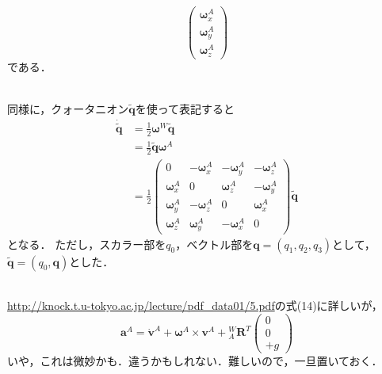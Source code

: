 \begin{description}
\begin{equation}
    \begin{pmatrix}
      \boldsymbol{\omega}^{A}_{x}\\
      \boldsymbol{\omega}^{A}_{y}\\
      \boldsymbol{\omega}^{A}_{z}
    \end{pmatrix}
  \end{equation}
  である．
\item[\fullref{subsec:quat}]\mbox{}\\
  同様に，クォータニオン$\tilde{\boldsymbol{q}}$を使って表記すると
  \begin{align}
    \dot{\tilde{\boldsymbol{q}}} & = \frac{1}{2}\boldsymbol{\omega}^{W}\tilde{\boldsymbol{q}}\\
    & = \frac{1}{2}\tilde{\boldsymbol{q}}\boldsymbol{\omega}^{A}\\
    & = \frac{1}{2}
    \begin{pmatrix}
      0                           & - \boldsymbol{\omega}^{A}_{x} & - \boldsymbol{\omega}^{A}_{y} & - \boldsymbol{\omega}^{A}_{z}\\
      \boldsymbol{\omega}^{A}_{x} & 0                             &   \boldsymbol{\omega}^{A}_{z} & - \boldsymbol{\omega}^{A}_{y}\\
      \boldsymbol{\omega}^{A}_{y} & - \boldsymbol{\omega}^{A}_{z} & 0                             &   \boldsymbol{\omega}^{A}_{x}\\
      \boldsymbol{\omega}^{A}_{z} &   \boldsymbol{\omega}^{A}_{y} & - \boldsymbol{\omega}^{A}_{x} & 0
    \end{pmatrix}
    \tilde{\boldsymbol{q}}
  \end{align}
  となる．
  ただし，スカラー部を$q_0$，ベクトル部を$\boldsymbol{q} = (q_1, q_2, q_3)$として，
  $\tilde{\boldsymbol{q}} = (q_0, \boldsymbol{q})$とした．
\item[\fullref{subsec:acc}]\mbox{}\\
  \url{http://knock.t.u-tokyo.ac.jp/lecture/pdf_data01/5.pdf}の式(14)に詳しいが，
  \begin{equation}
    \boldsymbol{a}^{A} = \dot{\boldsymbol{v}}^{A} + \boldsymbol{\omega}^{A} \times \boldsymbol{v}^{A} + {}^{W}_{A}\boldsymbol{R}^{T}
    \begin{pmatrix}
      0\\
      0\\
      +g
    \end{pmatrix}
  \end{equation}
  いや，これは微妙かも．違うかもしれない．難しいので，一旦置いておく．
\end{description}


